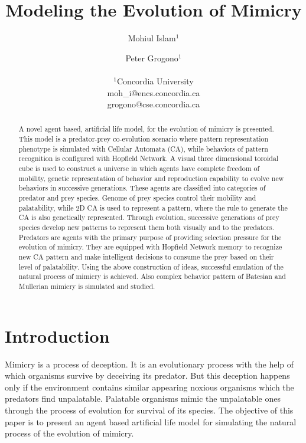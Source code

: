 \documentclass[letterpaper]{article}
\title{Modeling the Evolution of Mimicry}
\author{Mohiul Islam$^{1}$ \and Peter Grogono$^{1}$ \\
\mbox{}\\
$^1$Concordia University  \\
moh\_i@encs.concordia.ca \\
grogono@cse.concordia.ca}
\numberwithin{equation}{section}
\begin{document}
\maketitle

\begin{abstract}
A novel agent based, artificial life model, for the evolution of mimicry is presented. This model is a predator-prey co-evolution scenario where pattern representation phenotype is simulated with Cellular Automata (CA), while behaviors of pattern recognition is configured with Hopfield Network. A visual three dimensional toroidal cube is used to construct a universe in which agents have complete freedom of mobility, genetic representation of behavior and reproduction capability to evolve new behaviors in successive generations. These agents are classified into categories of predator and prey species. Genome of prey species control their mobility and palatability, while 2D CA is used to represent a pattern, where the rule to generate the CA is also genetically represented. Through evolution, successive generations of prey species develop new patterns to represent them both visually and to the predators. Predators are agents with the primary purpose of providing selection pressure for the evolution of mimicry. They are equipped with Hopfield Network memory to recognize new CA pattern and make intelligent decisions to consume the prey based on their level of palatability. Using the above construction of ideas, successful emulation of the natural process of mimicry is achieved. Also complex behavior pattern of Batesian and Mullerian mimicry is simulated and studied.
\end{abstract}

\section{Introduction}
\label{section:introduction}

Mimicry is a process of deception. It is an evolutionary process with the help of which organisms survive by deceiving its predator. But this deception happens only if the environment contains similar appearing noxious organisms which the predators find unpalatable. Palatable organisms mimic the unpalatable ones through the process of evolution for survival of its species. The objective of this paper is to present an agent based artificial life model for simulating the natural process of the evolution of mimicry.
\end{document}
